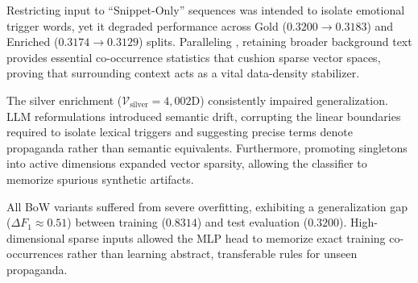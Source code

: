 \documentclass[12pt, a4paper]{article}
\begin{document}
Restricting input to ``Snippet-Only'' sequences was intended to isolate emotional trigger words, yet it degraded performance across Gold ($0.3200 \rightarrow 0.3183$) and Enriched ($0.3174 \rightarrow 0.3129$) splits. Paralleling \cite{pedersen2010}, retaining broader background text provides essential co-occurrence statistics that cushion sparse vector spaces, proving that surrounding context acts as a vital data-density stabilizer.

The silver enrichment ($\mathcal{V}_{\text{silver}} = 4,002\text{D}$) consistently impaired generalization. LLM reformulations introduced semantic drift, corrupting the linear boundaries required to isolate lexical triggers and suggesting precise terms denote propaganda rather than semantic equivalents. Furthermore, promoting singletons into active dimensions expanded vector sparsity, allowing the classifier to memorize spurious synthetic artifacts.

All BoW variants suffered from severe overfitting, exhibiting a generalization gap ($\Delta F_1 \approx 0.51$) between training ($0.8314$) and test evaluation ($0.3200$). High-dimensional sparse inputs allowed the MLP head to memorize exact training co-occurrences rather than learning abstract, transferable rules for unseen propaganda.
\end{document}
